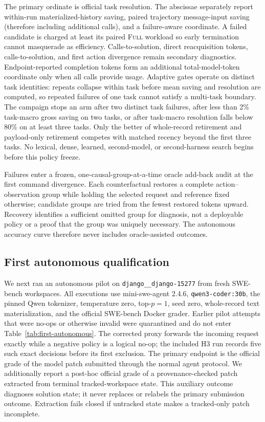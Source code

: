 \documentclass[11pt]{article}
\begin{document}
The primary ordinate is official task resolution.  The abscissae separately
report within-run materialized-history saving, paired trajectory
message-input saving (therefore including additional calls), and a
failure-aware coordinate.
A failed candidate is charged at least its paired \textsc{Full} workload so
early termination cannot masquerade as efficiency.  Calls-to-solution,
direct reacquisition tokens, calls-to-solution, and first action divergence
remain secondary diagnostics.
Endpoint-reported completion tokens form an additional total-model-token
coordinate only when all calls provide usage. Adaptive gates operate on
distinct task identities: repeats collapse within task before mean saving and
resolution are computed, so repeated failures of one task cannot satisfy a
multi-task boundary. The campaign stops an arm after two distinct task
failures, after less than 2\% task-macro gross saving on two tasks, or after
task-macro resolution falls below 80\% on at least three tasks. Only the better of
whole-record retirement and payload-only retirement competes with matched
recency beyond the first three tasks. No lexical, dense, learned, second-model,
or second-harness search begins before this policy freeze.

Failures enter a frozen, one-causal-group-at-a-time oracle add-back audit at
the first command divergence.  Each counterfactual restores a complete
action--observation group while holding the selected request and reference
fixed otherwise; candidate groups are tried from the fewest restored tokens
upward.  Recovery identifies a sufficient omitted group for diagnosis, not a
deployable policy or a proof that the group was uniquely necessary.  The
autonomous accuracy curve therefore never includes oracle-assisted outcomes.

\subsection{First autonomous qualification}

We next ran an autonomous pilot on
\texttt{django\_\_django-15277} from fresh SWE-bench workspaces. All executions use
mini-swe-agent 2.4.6, \texttt{qwen3-coder:30b}, the pinned Qwen tokenizer,
temperature zero, top-$p=1$, seed zero, whole-record text materialization, and
the official SWE-bench Docker grader. Earlier pilot attempts that were no-ops
or otherwise invalid were quarantined and do not enter
Table~\ref{tab:first-autonomous}. The corrected proxy forwards the incoming
request exactly while a negative policy is a logical no-op; the included H3
run records five such exact decisions before its first exclusion. The primary
endpoint is the official grade of the model patch submitted through the normal
agent protocol. We additionally report a post-hoc official grade of a
provenance-checked patch extracted from terminal tracked-workspace state. This
auxiliary outcome diagnoses solution state; it never replaces or relabels the
primary submission outcome. Extraction fails closed if untracked state makes a
tracked-only patch incomplete.
\end{document}
